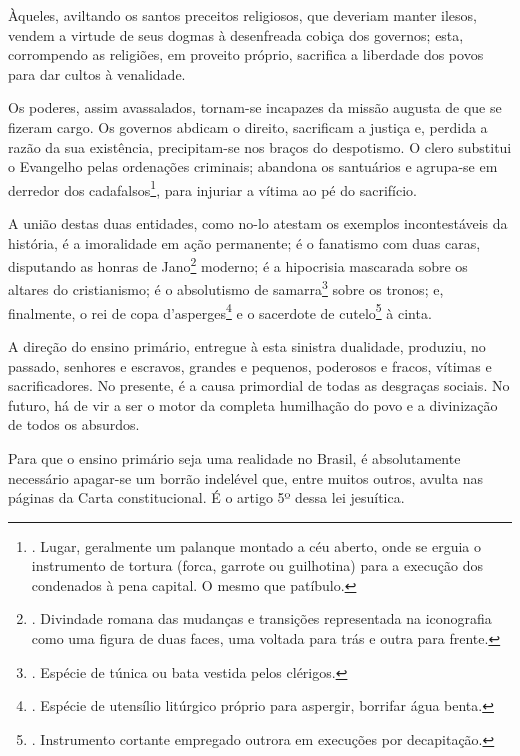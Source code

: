 Àqueles, aviltando os santos preceitos religiosos, que deveriam manter
ilesos, vendem a virtude de seus dogmas à desenfreada cobiça dos
governos; esta, corrompendo as religiões, em proveito próprio, sacrifica
a liberdade dos povos para dar cultos à venalidade.

Os poderes, assim avassalados, tornam-se incapazes da missão augusta de
que se fizeram cargo. Os governos abdicam o direito, sacrificam a
justiça e, perdida a razão da sua existência, precipitam-se nos braços
do despotismo. O clero substitui o Evangelho pelas ordenações criminais;
abandona os santuários e agrupa-se em derredor dos
cadafalsos\footnote{. Lugar, geralmente um palanque montado a céu
  aberto, onde se erguia o instrumento de tortura (forca, garrote ou
  guilhotina) para a execução dos condenados à pena capital. O mesmo que
  patíbulo.}, para injuriar a vítima ao pé do sacrifício.

A união destas duas entidades, como no-lo atestam os exemplos
incontestáveis da história, é a imoralidade em ação permanente; é o
fanatismo com duas caras, disputando as honras de Jano\footnote{.
  Divindade romana das mudanças e transições representada na iconografia
  como uma figura de duas faces, uma voltada para trás e outra para
  frente.} moderno; é a hipocrisia mascarada sobre os altares do
cristianismo; é o absolutismo de samarra\footnote{. Espécie de túnica ou
  bata vestida pelos clérigos.} sobre os tronos; e, finalmente, o rei de
copa d'asperges\footnote{. Espécie de utensílio litúrgico próprio para
  aspergir, borrifar água benta.} e o sacerdote de cutelo\footnote{.
  Instrumento cortante empregado outrora em execuções por decapitação.}
à cinta.

A direção do ensino primário, entregue à esta sinistra dualidade,
produziu, no passado, senhores e escravos, grandes e pequenos, poderosos
e fracos, vítimas e sacrificadores. No presente, é a causa primordial de
todas as desgraças sociais. No futuro, há de vir a ser o motor da
completa humilhação do povo e a divinização de todos os absurdos.

Para que o ensino primário seja uma realidade no Brasil, é absolutamente
necessário apagar-se um borrão indelével que, entre muitos outros,
avulta nas páginas da Carta constitucional. É o artigo 5º dessa lei
jesuítica.

